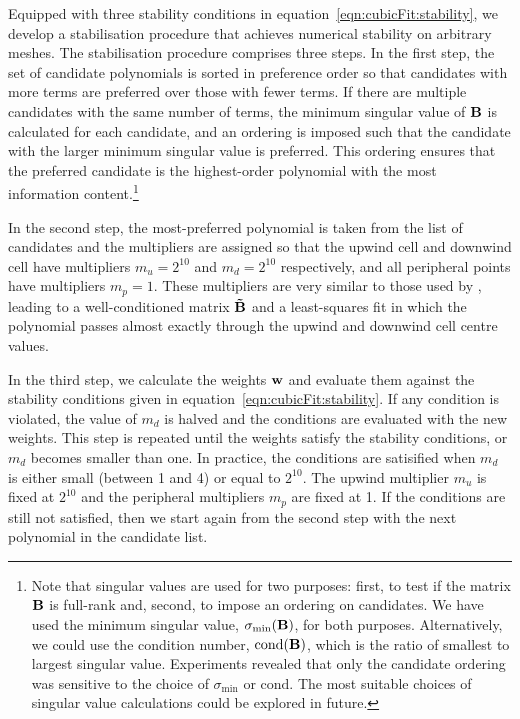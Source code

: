 Equipped with three stability conditions in equation~\ref{eqn:cubicFit:stability}, we develop a stabilisation procedure that achieves numerical stability on arbitrary meshes.
The stabilisation procedure comprises three steps.  In the first step, the set of candidate polynomials is sorted in preference order so that candidates with more terms are preferred over those with fewer terms.
If there are multiple candidates with the same number of terms, the minimum singular value of $\mathbf{B}$ is calculated for each candidate, and an ordering is imposed such that the candidate with the larger minimum singular value is preferred.  This ordering ensures that the preferred candidate is the highest-order polynomial with the most information content.\footnote{Note that singular values are used for two purposes: first, to test if the matrix $\mathbf{B}$ is full-rank and, second, to impose an ordering on candidates.
We have used the minimum singular value, $\sigma_\mathrm{min}(\mathbf{B})$, for both purposes.  Alternatively, we could use the condition number, $\mathrm{cond}(\mathbf{B})$, which is the ratio of smallest to largest singular value.
Experiments revealed that only the candidate ordering was sensitive to the choice of $\sigma_\mathrm{min}$ or $\mathrm{cond}$.
The most suitable choices of singular value calculations could be explored in future.}

In the second step, the most-preferred polynomial is taken from the list of candidates and the multipliers are assigned so that the upwind cell and downwind cell have multipliers $m_u = 2^{10}$ and $m_d = 2^{10}$ respectively, and all peripheral points have multipliers $m_p = 1$.  These multipliers are very similar to those used by \citet{lashley2002}, leading to a well-conditioned matrix $\mathbf{\tilde{B}}$ and a least-squares fit in which the polynomial passes almost exactly through the upwind and downwind cell centre values.

In the third step, we calculate the weights $\mathbf{w}$ and evaluate them against the stability conditions given in equation~\eqref{eqn:cubicFit:stability}.
If any condition is violated, the value of $m_d$ is halved and the conditions are evaluated with the new weights.  This step is repeated until the weights satisfy the stability conditions, or $m_d$ becomes smaller than one.  In practice, the conditions are satisified when $m_d$ is either small (between 1 and 4) or equal to $2^{10}$.  The upwind multiplier $m_u$ is fixed at $2^{10}$ and the peripheral multipliers $m_p$ are fixed at \num{1}.  If the conditions are still not satisfied, then we start again from the second step with the next polynomial in the candidate list. 

